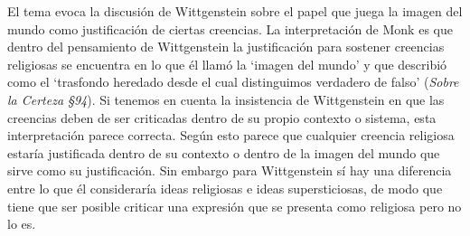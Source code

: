   El tema evoca la discusión de Wittgenstein sobre el papel que juega la imagen del mundo como justificación de ciertas creencias. La interpretación de Monk es que dentro del pensamiento de Wittgenstein la justificación para sostener creencias religiosas se encuentra en lo que él llamó la `imagen del mundo' y que describió como el \enquote*{trasfondo heredado desde el cual distinguimos verdadero de falso} (\emph{Sobre la Certeza \S94}). Si tenemos en cuenta la insistencia de Wittgenstein en que las creencias deben de ser criticadas dentro de su propio contexto o sistema, esta interpretación parece correcta. Según esto parece que cualquier creencia religiosa estaría justificada dentro de su contexto o dentro de la imagen del mundo que sirve como su justificación. Sin embargo para Wittgenstein sí hay una diferencia entre lo que él consideraría ideas religiosas e ideas supersticiosas, de modo que tiene que ser posible criticar una expresión que se presenta como religiosa pero no lo es.

